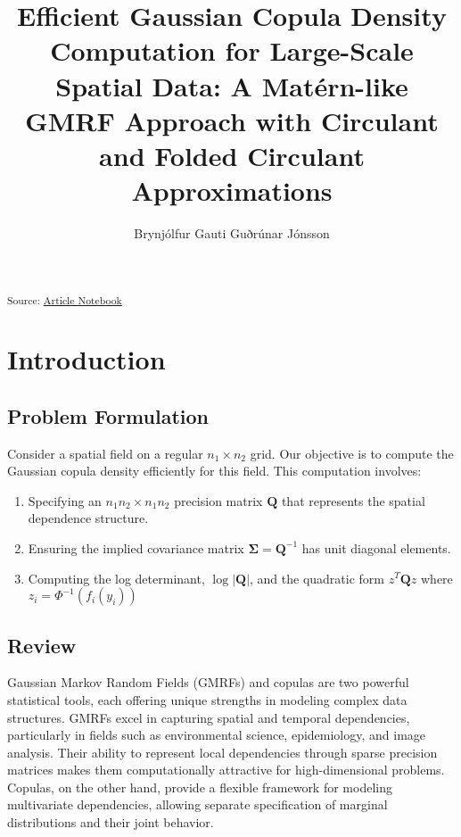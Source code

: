 \documentclass[journal=,manuscript=]{achemso}
\author{Brynjólfur Gauti Guðrúnar Jónsson}
\affiliation{ University of Iceland,  }
\title[]{Efficient Gaussian Copula Density Computation for Large-Scale
Spatial Data: A Matérn-like GMRF Approach with Circulant and Folded
Circulant Approximations}
\providecommand{\tightlist}{%
  \setlength{\itemsep}{0pt}\setlength{\parskip}{0pt}}\usepackage{longtable,booktabs,array}
\begin{document}
\maketitle


\textsubscript{Source:
\href{https://bgautijonsson.github.io/MaternEigenPaper/index.qmd.html}{Article
Notebook}}

\section{Introduction}\label{introduction}

\subsection{Problem Formulation}\label{problem-formulation}

Consider a spatial field on a regular \(n_1 \times n_2\) grid. Our
objective is to compute the Gaussian copula density efficiently for this
field. This computation involves:

\begin{enumerate}
\def\labelenumi{\arabic{enumi}.}
\tightlist
\item
  Specifying an \(n_1 n_2 \times n_1 n_2\) precision matrix
  \(\mathbf{Q}\) that represents the spatial dependence structure.
\item
  Ensuring the implied covariance matrix
  \(\mathbf{\Sigma} = \mathbf{Q}^{-1}\) has unit diagonal elements.
\item
  Computing the log determinant, \(\log |\mathbf Q|\), and the quadratic
  form \(z^T \mathbf Q z\) where \(z_i = \Phi^{-1}(f_i(y_i))\)
\end{enumerate}

\subsection{Review}\label{review}

Gaussian Markov Random Fields (GMRFs) and copulas are two powerful
statistical tools, each offering unique strengths in modeling complex
data structures. GMRFs excel in capturing spatial and temporal
dependencies, particularly in fields such as environmental science,
epidemiology, and image analysis. Their ability to represent local
dependencies through sparse precision matrices makes them
computationally attractive for high-dimensional problems. Copulas, on
the other hand, provide a flexible framework for modeling multivariate
dependencies, allowing separate specification of marginal distributions
and their joint behavior.
\end{document}
